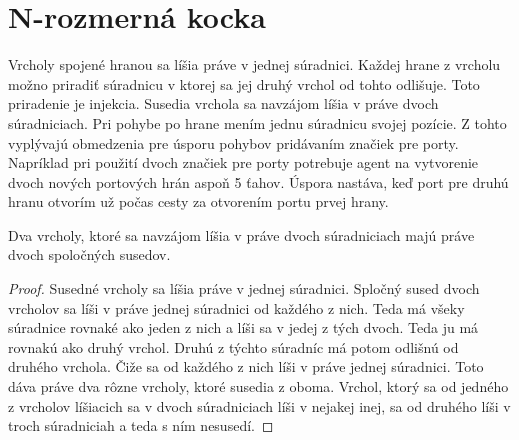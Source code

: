 \section{N-rozmerná kocka}
Vrcholy spojené hranou sa líšia práve v jednej súradnici. Každej hrane z
vrcholu možno priradiť súradnicu v ktorej sa jej druhý vrchol od tohto
odlišuje. Toto priradenie je injekcia.
Susedia vrchola sa navzájom líšia v práve dvoch súradniciach. Pri pohybe po
hrane mením jednu súradnicu svojej pozície. Z tohto vyplývajú obmedzenia
pre úsporu pohybov pridávaním značiek pre porty. Napríklad pri použití dvoch
značiek pre porty potrebuje agent na vytvorenie dvoch nových portových hrán
aspoň 5 ťahov. Úspora nastáva, keď port pre druhú hranu otvorím už počas
cesty za otvorením portu prvej hrany.

\begin{lem}
Dva vrcholy, ktoré sa navzájom líšia v práve dvoch súradniciach majú práve dvoch
spoločných susedov.
\end{lem}
\begin{proof}
Susedné vrcholy sa líšia práve v jednej súradnici. Spločný sused dvoch
vrcholov sa líši v práve jednej súradnici od každého z nich. Teda má všeky
súradnice rovnaké ako jeden z nich a líši sa v jedej z tých dvoch. Teda ju
má rovnakú ako druhý vrchol. Druhú z týchto súradníc má potom odlišnú od
druhého vrchola. Čiže sa od každého z nich líši v práve jednej súradnici.
Toto dáva práve dva rôzne vrcholy, ktoré susedia z oboma. Vrchol, ktorý
sa od jedného z vrcholov líšiacich sa v dvoch súradniciach líši v nejakej
inej, sa od druhého líši v troch súradniciah a teda s ním nesusedí.
\end{proof}


